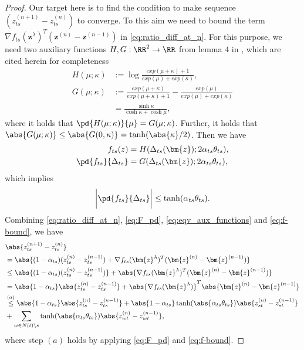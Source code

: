 \begin{proof}
  Our target here is to find the condition to make sequence $\left( z_{ts}^{(n+1)} - z_{ts}^{(n)} \right)$ to converge. To this aim we need to bound the term $\nabla f_{ts}(\bm{z}^{\lambda})^{T} (\bm{z}^{(n)} - \bm{z}^{(n-1)})$ in \eqref{eq:ratio_diff_at_n}. For this purpose, we need two auxiliary functions $H, G: \RR^2 \rightarrow \RR$ from lemma $4$ in \cite{roosta2008reweighed_sum_product}, which are cited herein for completeness
  \begin{align}
    H(\mu; \kappa) &:= \log \frac{exp(\mu + \kappa) +1}{exp(\mu) + exp(\kappa)}, \nonumber \\
    G(\mu; \kappa) &:= \frac{exp(\mu + \kappa)}{exp(\mu + \kappa) + 1} - \frac{exp(\mu)}{exp(\mu) + exp(\kappa)} \nonumber \\
                   &= \frac{\sinh{\kappa}}{\cosh{\kappa} + \cosh{\mu}},
  \end{align}
  where it holds that $\pd{H(\mu; \kappa)}{\mu} = G(\mu; \kappa)$. Further, it holds that
  $\abs{G(\mu; \kappa)} \leq \abs{G(0, \kappa)} = \tanh(\abs{\kappa}/2)$.
  Then we have
  \begin{align}\label{eq:eqv_aux_functions}
    f_{ts}(z) &= H(\Delta_{ts}(\bm{z}) ;2 \alpha_{ts} \theta_{ts}), \nonumber \\
    \pd{f_{ts}}{\Delta_{ts}} &= G(\Delta_{ts}(\bm{z}) ;2 \alpha_{ts} \theta_{ts}),
  \end{align}
  which implies
  \begin{equation}\label{eq:f-bound}
    \bigg|{\pd{f_{ts}}{\Delta_{ts}}}\bigg| \leq \tanh(\alpha_{ts}\theta_{ts}).
  \end{equation}
  Combining \eqref{eq:ratio_diff_at_n}, \eqref{eq:F_pd}, \eqref{eq:eqv_aux_functions} and \eqref{eq:f-bound}, we have
  \begin{align}\label{eq:ratio_cvg_step}
    &\abs{z_{ts}^{(n+1)} - z_{ts}^{(n)}} \nonumber\\
    & = \abs{(1-\alpha_{ts}) (z_{ts}^{(n)} - z_{ts}^{(n-1)}) + \nabla f_{ts}(\bm{z}^{\lambda})^{T} (\bm{z}^{(n)} - \bm{z}^{(n-1)})} \nonumber \\
    & \leq \abs{(1-\alpha_{ts}) (z_{ts}^{(n)} - z_{ts}^{(n-1)})} + \abs{\nabla f_{ts}(\bm{z}^{\lambda})^{T} (\bm{z}^{(n)} - \bm{z}^{(n-1)})} \nonumber \\
    & = \abs{ 1 - \alpha_{ts}} \abs{z_{ts}^{(n)} - z_{ts}^{(n-1)}} + \abs{\nabla f_{ts}(\bm{z}^{\lambda})}^{T} \abs{\bm{z}^{(n)} - \bm{z}^{(n-1)}} \nonumber \\
    & \overset{(a)}{\leq} \abs{ 1 - \alpha_{ts}} \abs{z_{ts}^{(n)} - z_{ts}^{(n-1)}} + \abs{ 1 - \alpha_{ts}} \tanh(\abs{\alpha_{ts} \theta_{ts}}) \abs{z_{st}^{(n)} - z_{st}^{(n-1)}} \nonumber \\
    &+ \sum_{w\in N(t)\backslash s} \tanh(\abs{\alpha_{ts} \theta_{ts}}) \abs{z_{wt}^{(n)} - z_{wt}^{(n-1)}},
  \end{align}
  where step $(a)$ holds by applying \eqref{eq:F_pd} and \eqref{eq:f-bound}.


\end{proof}
